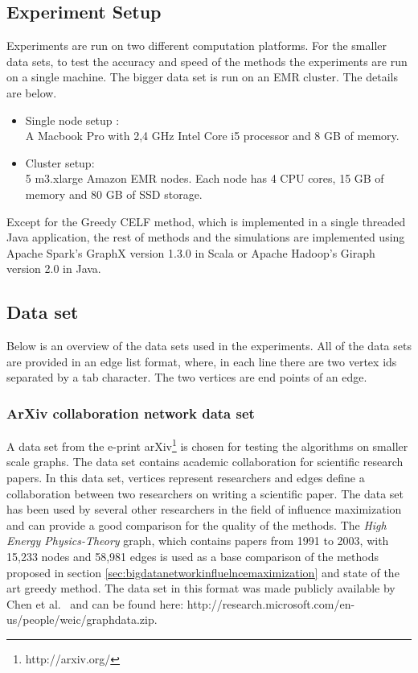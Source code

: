 \documentclass[english]{tktltiki}
\begin{document}
\subsection{Experiment Setup}
Experiments are run on two different computation platforms. 
For the smaller data sets, to test the accuracy and speed of the methods the experiments are run on a single machine. 
The bigger data set is run on an EMR cluster. 
The details are below. 
\begin{itemize}
\item Single node setup : \\
A Macbook Pro with 2,4 GHz Intel Core i5 processor and 8 GB of memory. 
\item Cluster setup: \\
5 m3.xlarge Amazon EMR nodes. Each node has 4 CPU cores, 15 GB of memory and 80 GB of SSD storage.
\end{itemize}
Except for the Greedy CELF method, which is implemented in a single threaded Java application, the rest of methods and the simulations are implemented using Apache Spark's GraphX version 1.3.0 in Scala or Apache Hadoop's Giraph version 2.0 in Java. 

\subsection{Data set}
Below is an overview of the data sets used in the experiments. 
All of the data sets are provided in an edge list format, where, in each line there are two vertex ids separated by a tab character. 
The two vertices are end points of an edge. 
\subsubsection{ArXiv collaboration network data set}
A data set from the e-print arXiv\footnote{http://arxiv.org/} is chosen for testing the algorithms on smaller scale graphs. 
The data set contains academic collaboration for scientific research papers. 
In this data set, vertices represent researchers and edges define a collaboration between two researchers on writing a scientific paper. 
The data set has been used by several other researchers in the field of influence maximization and can provide a good comparison for the quality of the methods. 
The \textit{High Energy Physics-Theory} graph, which contains papers from 1991 to 2003, with 15,233 nodes and 58,981 edges is used as a base comparison of the methods proposed in section \ref{sec:bigdatanetworkinfluelncemaximization} and state of the art greedy method. 
The data set in this format was made publicly available by Chen et al.\ \cite{chen09} and can be found here: http://research.microsoft.com/en-us/people/weic/graphdata.zip. 
\end{document}

